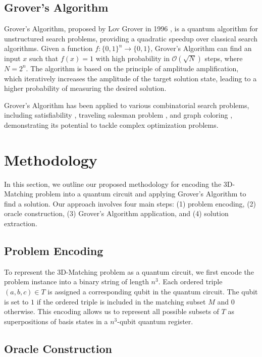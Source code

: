 \subsection{Grover's Algorithm}

Grover's Algorithm, proposed by Lov Grover in 1996 \cite{grover}, is a quantum algorithm for unstructured search problems, providing a quadratic speedup over classical search algorithms. Given a function $f : \{0, 1\}^n \rightarrow \{0, 1\}$, Grover's Algorithm can find an input $x$ such that $f(x) = 1$ with high probability in $\mathcal{O}(\sqrt{N})$ steps, where $N = 2^n$. The algorithm is based on the principle of amplitude amplification, which iteratively increases the amplitude of the target solution state, leading to a higher probability of measuring the desired solution.

Grover's Algorithm has been applied to various combinatorial search problems, including satisfiability \cite{grover_sat}, traveling salesman problem \cite{grover_tsp}, and graph coloring \cite{grover_coloring}, demonstrating its potential to tackle complex optimization problems.

\section{Methodology} \label{sec:methodology}

In this section, we outline our proposed methodology for encoding the 3D-Matching problem into a quantum circuit and applying Grover's Algorithm to find a solution. Our approach involves four main steps: (1) problem encoding, (2) oracle construction, (3) Grover's Algorithm application, and (4) solution extraction.

\subsection{Problem Encoding}

To represent the 3D-Matching problem as a quantum circuit, we first encode the problem instance into a binary string of length $n^3$. Each ordered triple $(a, b, c) \in T$ is assigned a corresponding qubit in the quantum circuit. The qubit is set to $1$ if the ordered triple is included in the matching subset $M$ and $0$ otherwise. This encoding allows us to represent all possible subsets of $T$ as superpositions of basis states in a $n^3$-qubit quantum register.

\subsection{Oracle Construction}

